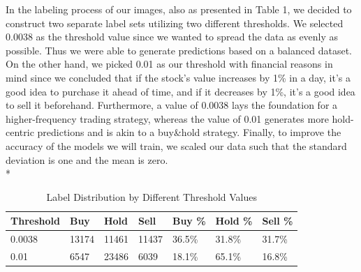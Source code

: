 \documentclass[]{article}
\begin{document}
In the labeling process of our images, also as presented in Table 1, we decided to construct two separate label sets utilizing two different thresholds. We selected 0.0038 as the threshold value since we wanted to spread the data as evenly as possible. Thus we were able to generate predictions based on a balanced dataset. On the other hand, we picked 0.01 as our threshold with financial reasons in mind since we concluded that if the stock's value increases by 1\% in a day, it's a good idea to purchase it ahead of time, and if it decreases by 1\%, it's a good idea to sell it beforehand. Furthermore, a value of 0.0038 lays the foundation for a higher-frequency trading strategy, whereas the value of 0.01 generates more hold-centric predictions and is akin to a buy\&hold strategy. Finally, to improve the accuracy of the models we will train, we scaled our data such that the standard deviation is one and the mean is zero.\vspace{0.1cm}\\*
\begin{table}[H]
\centering
    \caption{Label Distribution by Different Threshold Values}
\begin{tabular}{|l|c|c|c|l|l|l|}
\hline
Threshold & \multicolumn{1}{l|}{Buy} & \multicolumn{1}{l|}{Hold} & \multicolumn{1}{l|}{Sell} & Buy \% & Hold \% & Sell \% \\ \hline
0.0038     & 13174                     & 11461                      & 11437                      & 36.5\% & 31.8\%  & 31.7\%  \\ \hline
0.01      & \multicolumn{1}{l|}{6547} & \multicolumn{1}{l|}{23486} & \multicolumn{1}{l|}{6039}  & 18.1\% & 65.1\%  & 16.8\%  \\ \hline
\end{tabular}
\end{table}
\end{document}
